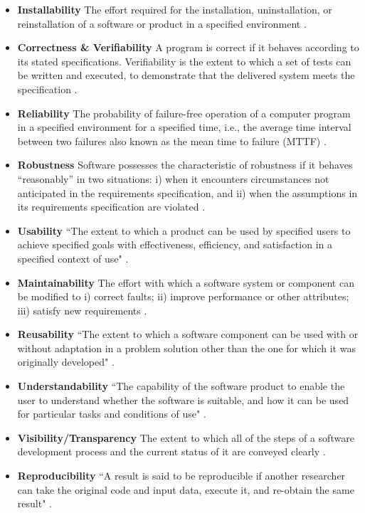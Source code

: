 \begin{itemize}
	\item \textbf{Installability} The effort required for the installation, uninstallation, or reinstallation of a software or product in a specified environment \cite{ISO/IEC25010} \cite{lenhard2013measuring}.

	\item \textbf{Correctness \& Verifiability} A program is correct if it behaves according to its stated specifications. Verifiability is the extent to which a set of tests can be written and executed, to demonstrate that the delivered system meets the specification \cite{GhezziEtAl2003}.

	\item \textbf{Reliability} The probability of failure-free operation of a computer program in a specified environment for a specified time, i.e., the average time interval between two failures also known as the mean time to failure (MTTF) \cite{musa1987software} 
	\cite{GhezziEtAl2003}.

	\item \textbf{Robustness} Software possesses the characteristic of robustness if it behaves ``reasonably'' in two situations: i) when it encounters circumstances not anticipated in the requirements specification, and ii) when the assumptions in its requirements specification are violated \cite{ghezzi1991fundamentals} \cite{boehm2007software}.

	\item \textbf{Usability} ``The extent to which a product can be used by specified users to achieve specified goals with effectiveness, efficiency, and satisfaction in a specified context of use" \cite{ISO/TR16982:2002} \cite{ISO9241-11:2018}.

	\item \textbf{Maintainability} The effort with which a software system or component can be modified to i) correct faults; ii) improve performance or other attributes; iii) satisfy new requirements \cite{IEEEStdGlossarySET1990} \cite{boehm2007software}.

	\item \textbf{Reusability} ``The extent to which a software component can be used with or without adaptation in a problem solution other than the one for which it was originally developed" \cite{kalagiakos2003non}.

	\item \textbf{Understandability} ``The capability of the software product to enable the user to understand whether the software is suitable, and how it can be used for particular tasks and conditions of use" \cite{iso2001iec}.

	\item \textbf{Visibility/Transparency} The extent to which all of the steps of a software development process and the current status of it are conveyed clearly \cite{ghezzi1991fundamentals}.

	\item \textbf{Reproducibility} ``A result is said to be reproducible if another researcher can take the original code and input data, execute it, and re-obtain the same result" \cite{BenureauAndRougier2017}.
\end{itemize}

